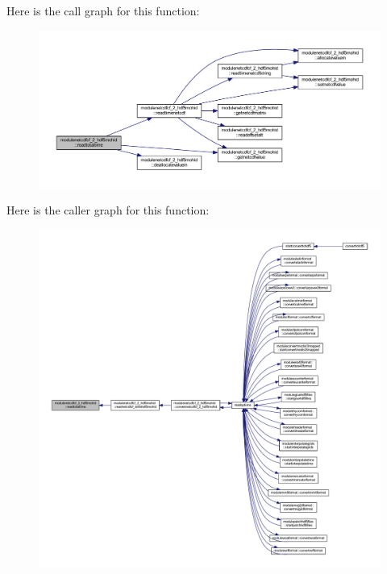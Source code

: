 Here is the call graph for this function\+:\nopagebreak
\begin{figure}[H]
\begin{center}
\leavevmode
\includegraphics[width=350pt]{namespacemodulenetcdfcf__2__hdf5mohid_acc82dcd56265bba5ab4bdb98fd785e4b_cgraph}
\end{center}
\end{figure}
Here is the caller graph for this function\+:\nopagebreak
\begin{figure}[H]
\begin{center}
\leavevmode
\includegraphics[width=350pt]{namespacemodulenetcdfcf__2__hdf5mohid_acc82dcd56265bba5ab4bdb98fd785e4b_icgraph}
\end{center}
\end{figure}
\mbox{\label{namespacemodulenetcdfcf__2__hdf5mohid_a5ea0bf1216f1cdc72e51ebf22b85884e}} 

